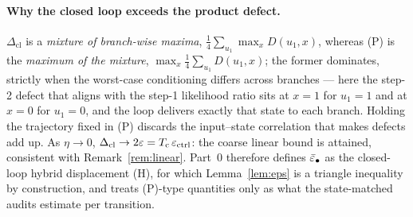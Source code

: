 \paragraph{Why the closed loop exceeds the product defect.}
$\Delta_{\mathrm{cl}}$ is a \emph{mixture of branch-wise maxima},
$\tfrac14\sum_{u_1}\max_x D(u_1,x)$, whereas (P) is the \emph{maximum of the
mixture}, $\max_x\tfrac14\sum_{u_1}D(u_1,x)$; the former dominates, strictly
when the worst-case conditioning differs across branches --- here the step-2
defect that aligns with the step-1 likelihood ratio sits at $x{=}1$ for
$u_1{=}1$ and at $x{=}0$ for $u_1{=}0$, and the loop delivers exactly that
state to each branch. Holding the trajectory fixed in (P) discards the
input--state correlation that makes defects add up. As $\eta\to0$,
$\Delta_{\mathrm{cl}}\to2\varepsilon=T_{\mathrm{c}}\,\varepsilon_{\mathrm{ctrl}}$: the coarse linear
bound is attained, consistent with Remark~\ref{rem:linear}. Part~0 therefore
defines $\bar\varepsilon_{\mathrm{\bullet}}$ as the closed-loop hybrid displacement (H), for
which Lemma~\ref{lem:eps} is a triangle inequality by construction, and treats
(P)-type quantities only as what the state-matched audits estimate per
transition.
